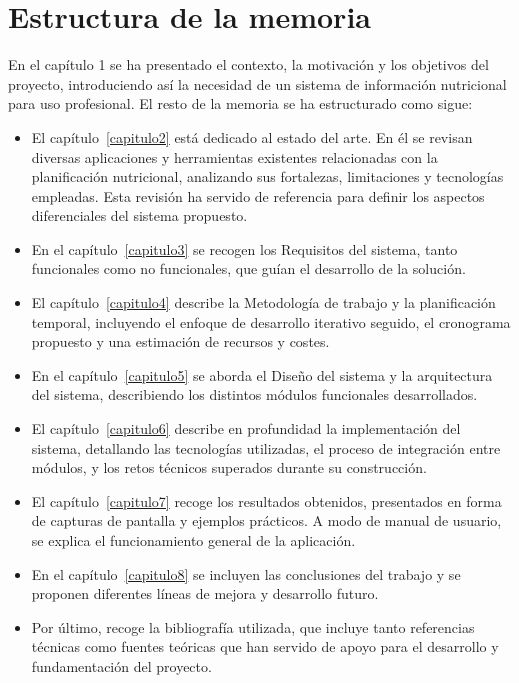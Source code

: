 \section{Estructura de la memoria}
En el capítulo 1 se ha presentado el contexto, la motivación y los objetivos del proyecto, introduciendo así la necesidad de un sistema de información nutricional para uso profesional. El resto de la memoria se ha estructurado como sigue:
\begin{itemize}
    \item El capítulo~\ref{capitulo2} está dedicado al estado del arte. En él se revisan diversas aplicaciones y herramientas existentes relacionadas con la planificación nutricional, analizando sus fortalezas, limitaciones y tecnologías empleadas. Esta revisión ha servido de referencia para definir los aspectos diferenciales del sistema propuesto.
    
    \item En el capítulo~\ref{capitulo3} se recogen los Requisitos del sistema, tanto funcionales como no funcionales, que guían el desarrollo de la solución.
    
    \item El capítulo~\ref{capitulo4} describe la Metodología de trabajo y la planificación temporal, incluyendo el enfoque de desarrollo iterativo seguido, el cronograma propuesto y una estimación de recursos y costes. 
    
    \item En el capítulo~\ref{capitulo5} se aborda el Diseño del sistema y la arquitectura del
    sistema, describiendo los distintos módulos funcionales desarrollados.
    
    \item El capítulo~\ref{capitulo6} describe en profundidad la implementación del sistema, detallando las tecnologías utilizadas, el proceso de integración entre módulos, y los retos técnicos superados durante su construcción.
    
    \item El capítulo~\ref{capitulo7} recoge los resultados obtenidos, presentados en forma de capturas de pantalla y ejemplos prácticos. A modo de manual de usuario, se explica el funcionamiento general de la aplicación.
    
    \item En el capítulo~\ref{capitulo8} se incluyen las conclusiones del trabajo y se proponen diferentes líneas de mejora y desarrollo futuro. 
    
    \item Por último, recoge la bibliografía utilizada, que incluye tanto referencias técnicas como fuentes teóricas que han servido de apoyo para el desarrollo y fundamentación del proyecto.
\end{itemize}


